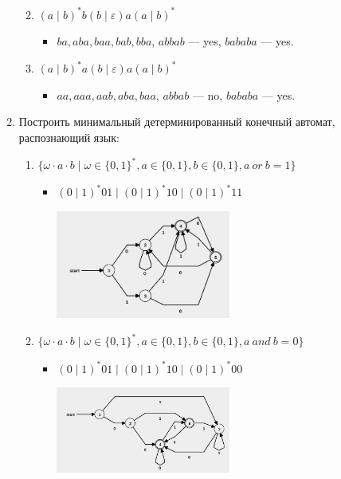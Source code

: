\documentclass[12pt]{article}
\begin{document}
\begin{enumerate}
\begin{enumerate}[label=\arabic*)]
\begin{itemize}
    \end{itemize}
    \item $(a \mid b)^* b (b \mid \varepsilon) a (a \mid b)^*$
    \begin{itemize}
      \item $ba, aba, baa, bab, bba$, $abbab$ --- yes, $bababa$ --- yes.
    \end{itemize}
    \item $(a \mid b)^* a (b \mid \varepsilon) a (a \mid b)^*$
    \begin{itemize}
      \item $aa, aaa, aab, aba, baa$, $abbab$ --- no, $bababa$ --- yes.
    \end{itemize}
  \end{enumerate}

  \item Построить минимальный детерминированный конечный автомат, распознающий язык:
  \begin{enumerate}[label=\arabic*)]
    \setlength\itemsep{0.8em}
    \item $\{ \omega \cdot a \cdot b \mid \omega \in \{0, 1\}^*, a \in \{0, 1\}, b \in \{0, 1\}, a \ or \ b = 1 \}$
    \begin{itemize}
      \item $ (0 \mid 1)^* 0 1 \mid (0 \mid 1)^* 1 0 \mid (0 \mid 1)^* 1 1$

      \includegraphics[width=0.5\textwidth]{2.1.png}
    \end{itemize}
    \item $\{ \omega \cdot a \cdot b \mid \omega \in \{0, 1\}^*, a \in \{0, 1\}, b \in \{0, 1\}, a \ and \ b = 0 \}$
    \begin{itemize}
      \item $ (0 \mid 1)^* 0 1 \mid (0 \mid 1)^* 1 0 \mid (0 \mid 1)^* 0 0$

      \includegraphics[width=0.5\textwidth]{2.2.png}
    \end{itemize}


\end{enumerate}
\end{enumerate}
\end{document}
